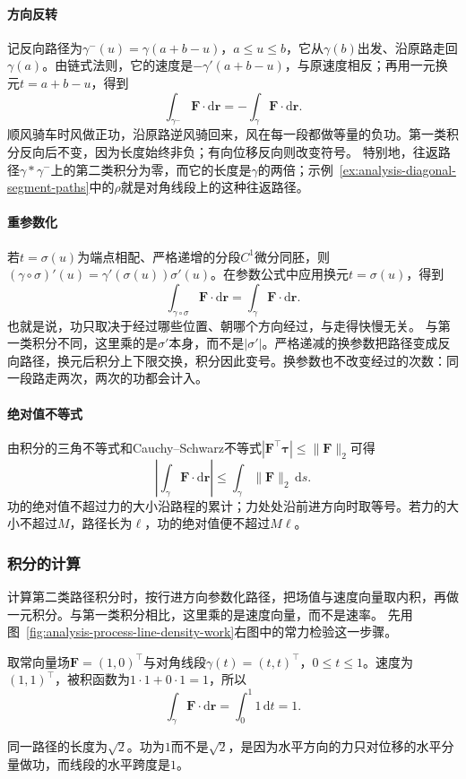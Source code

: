 \paragraph{方向反转}

记反向路径为$\gamma^{-}(u)=\gamma(a+b-u)$，$a\leq u\leq b$，它从$\gamma(b)$出发、沿原路走回$\gamma(a)$。由链式法则，它的速度是$-\gamma'(a+b-u)$，与原速度相反；再用一元换元$t=a+b-u$，得到
\[
 \int_{\gamma^{-}}\bm F\cdot\mathrm d\bm r
 =-\int_\gamma\bm F\cdot\mathrm d\bm r.
\]
顺风骑车时风做正功，沿原路逆风骑回来，风在每一段都做等量的负功。第一类积分反向后不变，因为长度始终非负；有向位移反向则改变符号。
特别地，往返路径$\gamma*\gamma^{-}$上的第二类积分为零，而它的长度是$\gamma$的两倍；示例~\ref{ex:analysis-diagonal-segment-paths}中的$\rho$就是对角线段上的这种往返路径。

\paragraph{重参数化}

若$t=\sigma(u)$为端点相配、严格递增的分段$C^1$微分同胚，则
$(\gamma\circ\sigma)'(u)=\gamma'(\sigma(u))\sigma'(u)$。在参数公式中应用换元$t=\sigma(u)$，得到
\[
 \int_{\gamma\circ\sigma}\bm F\cdot\mathrm d\bm r
 =\int_\gamma\bm F\cdot\mathrm d\bm r.
\]
也就是说，功只取决于经过哪些位置、朝哪个方向经过，与走得快慢无关。
与第一类积分不同，这里乘的是$\sigma'$本身，而不是$|\sigma'|$。严格递减的换参数把路径变成反向路径，换元后积分上下限交换，积分因此变号。换参数也不改变经过的次数：同一段路走两次，两次的功都会计入。

\paragraph{绝对值不等式}

由积分的三角不等式和Cauchy--Schwarz不等式$|\bm F^\top\bm\tau|\leq\lVert\bm F\rVert_2$可得
\[
 \left|\int_\gamma\bm F\cdot\mathrm d\bm r\right|
 \leq\int_\gamma\lVert\bm F\rVert_2\,\mathrm ds.
\]
功的绝对值不超过力的大小沿路程的累计；力处处沿前进方向时取等号。若力的大小不超过$M$，路径长为$\ell$，功的绝对值便不超过$M\ell$。

\subsubsection{积分的计算}

计算第二类路径积分时，按行进方向参数化路径，把场值与速度向量取内积，再做一元积分。与第一类积分相比，这里乘的是速度向量，而不是速率。
先用图~\ref{fig:analysis-process-line-density-work}右图中的常力检验这一步骤。
\begin{example}[常力沿对角线段做功]
取常向量场$\bm F=(1,0)^\top$与对角线段$\gamma(t)=(t,t)^\top$，$0\leq t\leq1$。速度为$(1,1)^\top$，被积函数为$1\cdot1+0\cdot1=1$，所以
\[
 \int_\gamma\bm F\cdot\mathrm d\bm r=\int_0^1 1\,\mathrm dt=1.
\]
\end{example}
同一路径的长度为$\sqrt2$。功为$1$而不是$\sqrt2$，是因为水平方向的力只对位移的水平分量做功，而线段的水平跨度是$1$。

